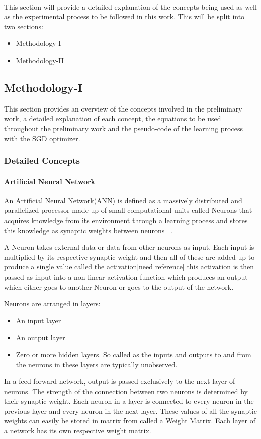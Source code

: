 \documentclass{article}
\begin{document}
\paragraph{} This section will provide a detailed explanation of the concepts being used as well as the experimental process to be followed in this work. This will be split into two sections:
\begin{itemize}
	\item Methodology-I
	\item Methodology-II
\end{itemize}

\subsection{Methodology-I}
This section provides an overview of the concepts involved in the preliminary work, a detailed explanation of each concept, the equations to be used throughout the preliminary work and the pseudo-code of the learning process with the SGD optimizer. 
\subsubsection{Detailed Concepts}
\paragraph{Artificial Neural Network} An Artificial Neural Network(ANN) is defined as a massively distributed and parallelized processor made up of small computational units called Neurons that acquires knowledge from its environment through a learning process and stores this knowledge as synaptic weights between neurons ~\cite{ANNDefinition}. 

A Neuron takes external data or data from other neurons as input. Each input is multiplied by its respective synaptic weight and then all of these are added up to produce a single value called the activation[need reference] this activation is then passed as input into a non-linear activation function which produces an output which either goes to another Neuron or goes to the output of the network.

Neurons are arranged in layers:
\begin{itemize}
	\item An input layer
	\item An output layer
	\item Zero or more hidden layers. So called as the inputs and outputs to and from the neurons in these layers are typically unobserved.
\end{itemize}
In a feed-forward network, output is passed exclusively to the next layer of neurons. The strength of the connection between two neurons is determined by their synaptic weight. Each neuron in a layer is connected to every neuron in the previous layer and every neuron in the next layer. These values of all the synaptic weights can easily be stored in matrix from called a Weight Matrix. Each layer of a network has its own respective weight matrix. 
\end{document}

